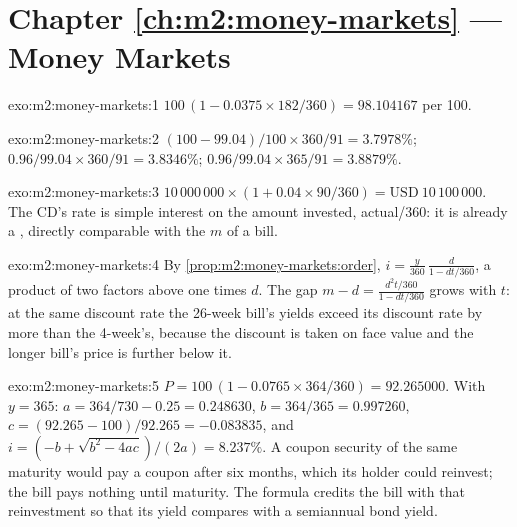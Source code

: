 \section*{Chapter \ref{ch:m2:money-markets} --- Money Markets}

\begin{solution}{exo:m2:money-markets:1}
$100\,(1 - 0.0375 \times 182/360) = 98.104167$ per 100.
\end{solution}

\begin{solution}{exo:m2:money-markets:2}
 $(100 - 99.04)/100 \times 360/91 = 3.7978\%$; 
$0.96/99.04 \times 360/91 = 3.8346\%$;  $0.96/99.04
\times 365/91 = 3.8879\%$.
\end{solution}

\begin{solution}{exo:m2:money-markets:3}
$10\,000\,000 \times (1 + 0.04 \times 90/360) = \text{USD}~10\,100\,000$. The CD's
rate is simple interest on the amount invested, actual/360: it is already a
, directly comparable with the $m$ of a bill.
\end{solution}

\begin{solution}{exo:m2:money-markets:4}
By \cref{prop:m2:money-markets:order}, $i = \frac{y}{360}\,\frac{d}{1 -
dt/360}$, a product of two factors above one times $d$. The gap $m - d =
\frac{d^2 t/360}{1 - dt/360}$ grows with $t$: at the same discount rate the
26-week bill's yields exceed its discount rate by more than the 4-week's,
because the discount is taken on face value and the longer bill's price is
further below it.
\end{solution}

\begin{solution}{exo:m2:money-markets:5}
$P = 100\,(1 - 0.0765 \times 364/360) = 92.265000$. With $y = 365$: $a =
364/730 - 0.25 = 0.248630$, $b = 364/365 = 0.997260$, $c = (92.265 -
100)/92.265 = -0.083835$, and $i = (-b + \sqrt{b^2 - 4ac})/(2a) = 8.237\%$. A
coupon security of the same maturity would pay a coupon after six months,
which its holder could reinvest; the bill pays nothing until maturity. The
formula credits the bill with that reinvestment so that its yield compares
with a semiannual bond yield.
\end{solution}

